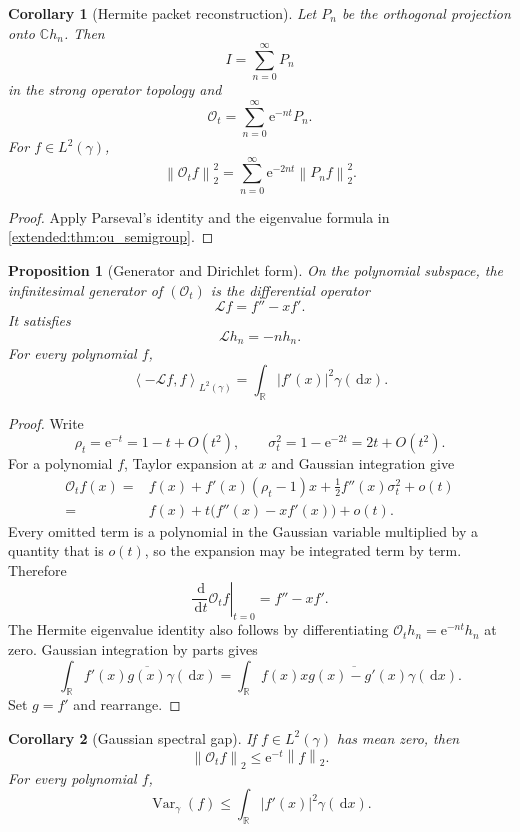 \documentclass[11pt,letterpaper]{article}
\theoremstyle{plain}
\newtheorem{proposition}[proposition]{Proposition}
\theoremstyle{plain}
\theoremstyle{plain}
\newtheorem{corollary}[corollary]{Corollary}
\theoremstyle{definition}
\theoremstyle{definition}
\theoremstyle{definition}
\theoremstyle{definition}
\theoremstyle{definition}
\theoremstyle{remark}
\theoremstyle{remark}
\theoremstyle{remark}
\theoremstyle{remark}
\theoremstyle{remark}
\newcommand{\Var}{\operatorname{Var}}
\newcommand{\norm}[1]{\left\lVert#1\right\rVert}
\theoremstyle{remark}
\newcommand{\CC}{\mathbb C}
\newcommand{\RR}{\mathbb R}
\newcommand{\Lcal}{\mathcal L}
\newcommand{\Ocal}{\mathcal O}
\newcommand{\e}{\mathrm e}
\newcommand{\dd}{\,\mathrm d}
\newcommand{\abs}[1]{\left\lvert#1\right\rvert}
\newcommand{\ip}[2]{\left\langle#1,#2\right\rangle}
\let\KomorebiPrimitiveMathcal\mathcal
\renewcommand{\mathcal}[1]{{\KomorebiPrimitiveMathcal{#1}}}
\let\KomorebiPrimitivemathbb\mathbb
\renewcommand{\mathbb}[1]{{\KomorebiPrimitivemathbb{#1}}}
\let\KomorebiPrimitivemathrm\mathrm
\renewcommand{\mathrm}[1]{{\KomorebiPrimitivemathrm{#1}}}
\begin{document}
\begin{corollary}[Hermite packet reconstruction]\label{extended:record:041}\label{extended:cor:hermite_packets}
Let \(P_n\) be the orthogonal projection onto \(\CC h_n\). Then
\[
I=\sum_{n=0}^\infty P_n
\]
in the strong operator topology and
\[
\Ocal_t
=
\sum_{n=0}^\infty\e^{-nt}P_n.
\]
For \(f\in L^2(\gamma)\),
\[
\norm{\Ocal_t f}_2^2
=
\sum_{n=0}^\infty
\e^{-2nt}\norm{P_nf}_2^2.
\]
\end{corollary}

\begin{proof}
Apply Parseval's identity and the eigenvalue formula in \cref{extended:thm:ou_semigroup}.
\end{proof}

\begin{proposition}[Generator and Dirichlet form]\label{extended:record:042}\label{extended:prop:ou_generator}
On the polynomial subspace, the infinitesimal generator of \((\Ocal_t)\) is the differential operator
\[
\Lcal f=f''-xf'.
\]
It satisfies
\[
\Lcal h_n=-nh_n.
\]
For every polynomial \(f\),
\[
\ip{-\Lcal f}{f}_{L^2(\gamma)}
=
\int_\RR\abs{f'(x)}^2\gamma(\dd x).
\]
\end{proposition}

\begin{proof}
Write
\[
\rho_t=\e^{-t}=1-t+O(t^2),
\qquad
\sigma_t^2=1-\e^{-2t}=2t+O(t^2).
\]
For a polynomial \(f\), Taylor expansion at \(x\) and Gaussian integration give
\[
\begin{aligned}
\Ocal_tf(x)
={}&f(x)
+f'(x)(\rho_t-1)x
+\frac12f''(x)\sigma_t^2
+o(t)\\
={}&f(x)+t\bigl(f''(x)-xf'(x)\bigr)+o(t).
\end{aligned}
\]
Every omitted term is a polynomial in the Gaussian variable multiplied by a quantity that is \(o(t)\), so the expansion may be integrated term by term. Therefore
\[
\left.\frac{\dd}{\dd t}\Ocal_tf\right|_{t=0}
=f''-xf'.
\]
The Hermite eigenvalue identity also follows by differentiating
\(
\Ocal_th_n=\e^{-nt}h_n
\)
at zero. Gaussian integration by parts gives
\[
\int_\RR f'(x)\overline{g(x)}\gamma(\dd x)
=
\int_\RR f(x)\overline{xg(x)-g'(x)}\gamma(\dd x).
\]
Set \(g=f'\) and rearrange.
\end{proof}

\begin{corollary}[Gaussian spectral gap]\label{extended:record:043}\label{extended:cor:ou_spectral_gap}
If \(f\in L^2(\gamma)\) has mean zero, then
\[
\norm{\Ocal_tf}_2
\leq
\e^{-t}\norm f_2.
\]
For every polynomial \(f\),
\[
\Var_\gamma(f)
\leq
\int_\RR\abs{f'(x)}^2\gamma(\dd x).
\]
\end{corollary}
\end{document}
